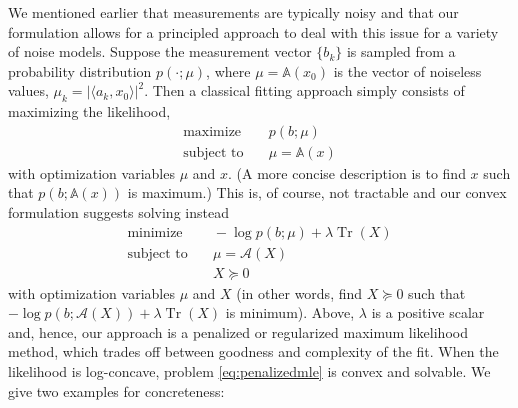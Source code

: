 \documentclass[11pt]{article}
\newcommand{\<}{\langle}
\renewcommand{\>}{\rangle}
\newcommand{\cA}{\mathcal{A}}
\newcommand{\mapA}{\mathbb{A}}
\newcommand{\trace}{\operatorname{Tr}}
\numberwithin{equation}{section}
\begin{document}
We mentioned earlier that measurements are typically noisy and that
our formulation allows for a principled approach to deal with this
issue for a variety of noise models. Suppose the measurement vector
$\{b_k\}$ is sampled from a probability distribution $p(\cdot ; \mu)$,
where $\mu = \mapA(x_0)$ is the vector of noiseless values, $\mu_k =
|\<a_k, x_0\>|^2$. Then a classical fitting approach simply consists
of maximizing the likelihood,
\begin{equation}
\label{eq:mle}
 \begin{array}{ll}
    \text{maximize}   & \quad p(b; \mu)\\ 
    \text{subject to} & \quad  \mu = \mapA(x)
\end{array}
\end{equation}
with optimization variables $\mu$ and $x$. (A more concise
  description is to find $x$ such that $ p(b; \mapA(x))$ is maximum.)
This is, of course, not tractable and our convex formulation suggests
solving instead
\begin{equation}
\label{eq:penalizedmle}
 \begin{array}{ll}
   \text{minimize}   & \quad -\log p(b; \mu) + \lambda \trace(X)\\ 
   \text{subject to} & \quad  \mu = \cA(X)\\
   & \quad X \succeq 0
\end{array}
\end{equation}
with optimization variables $\mu$ and $X$ (in other words, find $X
\succeq 0$ such that $-\log p(b; \cA(X)) + \lambda \trace(X)$ is
minimum). Above, $\lambda$ is a positive scalar and, hence, our
approach is a penalized or regularized maximum likelihood method,
which trades off between goodness and complexity of the fit. When the
likelihood is log-concave, problem \eqref{eq:penalizedmle} is convex
and solvable. We give two examples for concreteness:
\end{document}
